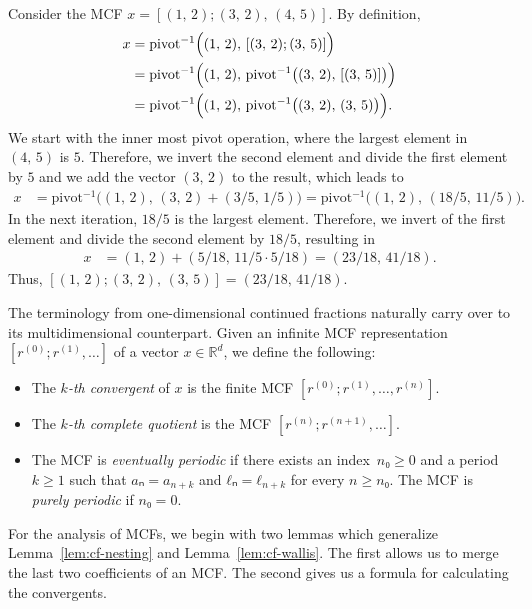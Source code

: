 \begin{example}
  Consider the MCF $x = [(1,\, 2); (3,\, 2),\, (4,\, 5)]$.
  By definition,
  \begin{align*}
    x & = \mathrm{pivot}^{-1}\Bigl((1,\, 2),\, [(3,\, 2); (3,\, 5)]\Bigr) \\
      & = \mathrm{pivot}^{-1}\Bigl((1,\, 2),\, \mathrm{pivot}^{-1}\bigl((3,\, 2),\, [(3,\, 5)]\bigr)\Bigr) \\
      & = \mathrm{pivot}^{-1}\Bigl((1,\, 2),\, \mathrm{pivot}^{-1}\bigl((3,\, 2),\, (3,\, 5)\bigr)\Bigr).
  \end{align*}
  We start with the inner most pivot operation,
  where the largest element in $(4,\, 5)$ is $5$.
  Therefore, we invert the second element and divide the first element by $5$
  and we add the vector $(3,\, 2)$ to the result, which leads to
  \begin{align*}
    x & = \mathrm{pivot}^{-1}\bigl((1,\, 2),\, (3,\, 2) + (3/5,\, 1/5)\bigr)
        = \mathrm{pivot}^{-1}\bigl((1,\, 2),\, (18/5,\, 11/5)\bigr).
  \end{align*}
  In the next iteration, $18/5$ is the largest element.
  Therefore, we invert of the first element and divide the second element by $18/5$,
  resulting in
  \begin{align*}
    x & = (1,\, 2) + (5/18,\, 11/5 · 5/18) = (23/18,\, 41/18).
  \end{align*}
  Thus, $[(1,\, 2); (3,\, 2),\, (3,\, 5)] = (23/18,\, 41/18)$.
\end{example}

The terminology from one-dimensional continued fractions naturally carry over to its
multidimensional counterpart.
Given an infinite MCF representation~$[r^{(0)}; r^{(1)}, …]$ of a vector $x ∈ ℝ^d$, we define the following:

\begin{itemize}
  \item The \emph{$k$-th convergent} of $x$ is the finite MCF $[r^{(0)}; r^{(1)}, …, r^{(n)}]$.
  \item The \emph{$k$-th complete quotient} is the MCF $[r^{(n)}; r^{(n+1)}, …]$.
  \item The MCF is \emph{eventually periodic} if there exists an index~$n₀ ≥ 0$
    and a period~$k ≥ 1$ such that $aₙ = a_{n+k}$ and $ℓₙ = ℓ_{n+k}$
    for every $n ≥ n₀$.
    The MCF is \emph{purely periodic} if $n₀ = 0$.
\end{itemize}

For the analysis of MCFs,
we begin with two lemmas which generalize Lemma~\ref{lem:cf-nesting} and
Lemma~\vref{lem:cf-wallis}.
The first allows us to merge the last two coefficients of an MCF.
The second gives us a formula for calculating the convergents.

